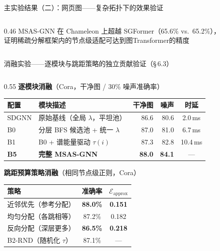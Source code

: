 \documentclass[aspectratio=169,9pt,xcolor=dvipsnames]{beamer}
\newcommand{\highlight}[1]{\textcolor{myred}{\textbf{#1}}}
\newcommand{\blue}[1]{\textcolor{mynavy}{#1}}
\newcommand{\green}[1]{\textcolor{mygreen}{#1}}
\begin{document}
\begin{frame}{主实验结果（二）：网页图——复杂拓扑下的效果验证}
\begin{columns}[T]
\begin{column}{0.46\textwidth}
      \vspace{0.1cm}
      MSAS-GNN 在 Chameleon 上超越 SGFormer（65.6\% vs.\ 65.2\%），\\
      证明稀疏分解框架内的节点级适配可达到图Transformer的精度
    \end{column}
  \end{columns}
\end{frame}

\begin{frame}{消融实验——逐模块与跳距策略的独立贡献验证（§\,6.3）}
  \begin{columns}[T]
    \begin{column}{0.55\textwidth}
      \textbf{\blue{逐模块消融}}（Cora，干净图 / 30\% 噪声准确率）
      \begin{center}\small
      \begin{tabular}{p{0.75cm}p{3.5cm}rrc}
        \toprule
        配置 & 模块描述 & 干净图 & 噪声 & 时延\\
        \midrule
        SDGNN & 原始基线（全局 $\lambda$，平坦池） & 86.6 & 80.6 & 2.0\,ms\\
        B0    & 分层 BFS 候选池 + 统一 $\lambda$ & 87.0 & 81.0 & 6.7\,ms\\
        B1    & B0 + 谱能量驱动 $\tau(i)$ & 87.3 & 82.8 & 10.4\,ms\\
        \textbf{B5} & \textbf{完整 MSAS-GNN} & \textbf{88.0} & \textbf{84.1} & —\\
        \bottomrule
      \end{tabular}
      \end{center}

      \vspace{0.15cm}
      \textbf{\blue{跳距预算策略消融}}（相同节点级正则，Cora）
      \begin{center}\small
      \begin{tabular}{p{3.0cm}cc}
        \toprule
        策略 & 准确率 & $\mathcal{E}_{\mathrm{approx}}$\\
        \midrule
        近邻优先（参考分配） & \green{\textbf{88.0\%}} & \green{\textbf{0.151}}\\
        均匀分配（各跳相等） & 87.2\% & 0.182\\
        反向分配（深层更多） & \highlight{86.5\%} & \highlight{0.218}\\
        B2-RND（随机化 $\tau$） & 87.1\% & —\\
        \bottomrule
      \end{tabular}
      \end{center}
    \end{column}


\end{columns}
\end{frame}
\end{document}
